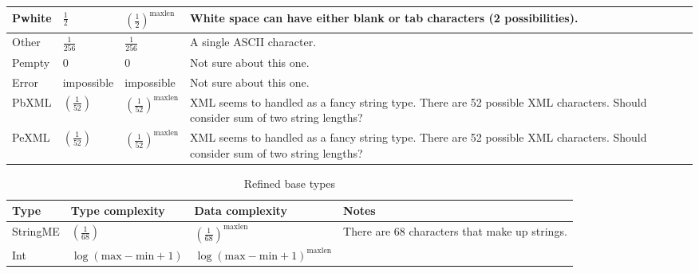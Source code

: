 \begin{longtable}{||l|l|l|l|}
\textsf{Pwhite} & $\frac{1}{2}$ & $\left(\frac{1}{2}\right)^\mathrm{maxlen}$ &
\parbox[t]{5cm}{
White space can have either blank or tab characters (2 possibilities).
\vspace{0.5mm}} \\\hline

\textsf{Other} & $\frac{1}{256}$ & $\frac{1}{256}$ &
\parbox[t]{5cm}{
A single ASCII character.
\vspace{0.5mm}} \\\hline

\textsf{Pempty} & 0 & 0 &
\parbox[t]{5cm}{
Not sure about this one.
\vspace{0.5mm}} \\\hline

\textsf{Error} & \textsf{impossible} & \textsf{impossible} &
\parbox[t]{5cm}{
Not sure about this one.
\vspace{0.5mm}} \\\hline

\textsf{PbXML} &
      $\left(\frac{1}{52}\right)$ &
      $\left(\frac{1}{52}\right)^\mathrm{maxlen} $ &
\parbox[t]{5cm}{
XML seems to handled as a fancy string type. There are 52 possible XML
characters.  Should consider sum of two string lengths?
\vspace{0.5mm}} \\\hline

\textsf{PeXML} &
      $\left(\frac{1}{52}\right)$ &
      $\left(\frac{1}{52}\right)^\mathrm{maxlen}$ &
\parbox[t]{5cm}{
XML seems to handled as a fancy string type. There are 52 possible XML
characters.  Should consider sum of two string lengths?
\vspace{0.5mm}} \\\hline

\end{longtable}

\begin{longtable}{||l|l|l|l|}
\caption[Refined base types]{Refined base types}
\label{tab:v2RefinedBase}
\\\hline
\hline
Type & Type complexity & Data complexity & Notes \\\hline\hline

\textsf{StringME} &
    $\left(\frac{1}{68}\right)$ &
    $\left(\frac{1}{68}\right)^\mathrm{maxlen}$ &
\parbox[t]{5cm}{
There are 68 characters that make up strings.
\vspace{0.5mm}} \\\hline

\textsf{Int} &
    $\log (\mathrm{max} - \mathrm{min} + 1)$ &
    $\log (\mathrm{max} - \mathrm{min} + 1)^\mathrm{maxlen}$ &
\parbox[t]{5cm}{
\vspace{0.5mm}} \\\hline

\end{longtable}
